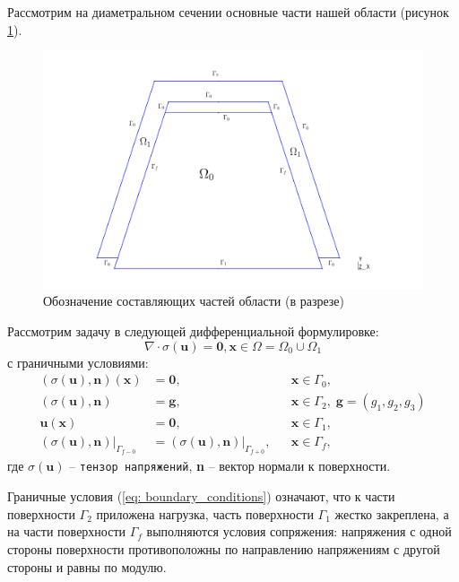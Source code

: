 \documentclass[a4paper, 14pt]{extreport}
\begin{document}
Рассмотрим на диаметральном сечении основные части нашей области 
(рисунок \ref{fig: marked_domain}).
\begin{figure}[ht]
	\center
	\includegraphics[scale=0.25]{pictures/marked_domain.png}
	\caption{Обозначение составляющих частей области (в разрезе)}
	\label{fig: marked_domain}
\end{figure}

Рассмотрим задачу в следующей дифференциальной формулировке:
\begin{equation}
	\label{eq:1}
	\nabla\!\cdot\!\sigma(\textbf{u}) = \textbf{0}, \textbf{x} \in \Omega = \Omega_0 \cup \Omega_1
\end{equation}
с граничными условиями:
\begin{equation}
	\label{eq: boundary_conditions}
	\begin{aligned}
		(\sigma(\textbf{u}), \textbf{n})(\textbf{x}) 	  	  &= \textbf{0},   &&\textbf{x} \in \Gamma_0,\\
		(\sigma(\textbf{u}), \textbf{n}) 				  	  &= \textbf{g},   &&\textbf{x} \in \Gamma_2, \; \textbf{g} = (g_1, g_2, g_3)\\
		\textbf{u}(\textbf{x})							  	  &= \textbf{0},	   &&\textbf{x} \in \Gamma_1,\\
		(\sigma(\textbf{u}), \textbf{n})\vert_{\Gamma_{f - 0}} &= 
			(\sigma(\textbf{u}), \textbf{n})\vert_{\Gamma_{f + 0}},             &&\textbf{x} \in \Gamma_f,
	\end{aligned}
\end{equation}
где $\sigma(\textbf{u})$  -- \texttt{тензор напряжений}, \textbf{n} -- вектор нормали
к поверхности. 

Граничные условия (\ref{eq: boundary_conditions}) означают, что к части поверхности 
$\Gamma_2$ приложена нагрузка, часть поверхности $\Gamma_1$ жестко закреплена, 
а на части поверхности $\Gamma_f$ выполняются условия сопряжения: напряжения 
с одной стороны поверхности противоположны по направлению напряжениям с 
другой стороны и равны по модулю.
\end{document}
